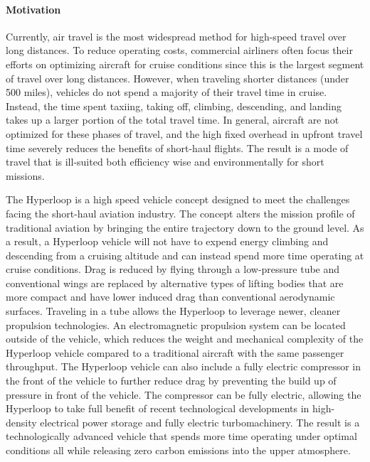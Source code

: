 \paragraph{Motivation}

	Currently, air travel is the most widespread method for high-speed travel over long distances.
	To reduce operating costs, commercial airliners often focus their efforts on optimizing aircraft for
	cruise conditions since this is the largest segment of travel over long distances.
	However, when traveling shorter distances (under 500 miles),
	vehicles do not spend a majority of their travel time in cruise.
	Instead, the time spent taxiing, taking off, climbing, descending, and landing
	takes up a larger portion of the total travel time. In general, aircraft are not optimized
	for these phases of travel, and the high fixed overhead in upfront travel time severely reduces the benefits of short-haul flights. The result is a mode of travel that is
	ill-suited both efficiency wise and environmentally for short missions.

	The Hyperloop is a high speed vehicle concept designed to meet the
	challenges facing the short-haul aviation industry.
	The concept alters the mission profile of traditional aviation by bringing
	the entire trajectory down to the ground level.
	As a result, a Hyperloop vehicle will not have to expend energy climbing and descending from
	a cruising altitude and can instead spend more time operating at cruise conditions.
	Drag is reduced by flying through a low-pressure tube
	and conventional wings are replaced by alternative types of lifting bodies
	that are more compact and have lower induced drag than conventional aerodynamic surfaces.
	Traveling in a tube allows the Hyperloop to leverage newer, cleaner propulsion technologies.
	An electromagnetic propulsion system can be located outside of the vehicle,
	which reduces the weight and mechanical complexity of the Hyperloop vehicle compared to a
	traditional aircraft with the same passenger throughput.
	The Hyperloop vehicle can also include a fully electric compressor in the front of the vehicle to
	further reduce drag by preventing the build up of pressure in front of the vehicle.
	The compressor can be fully electric, allowing the Hyperloop to take full
	benefit of recent technological developments in
	high-density electrical power storage and fully electric turbomachinery.
	The result is a technologically advanced vehicle that spends more time operating under optimal conditions
	all while releasing zero carbon emissions into the upper atmosphere.


